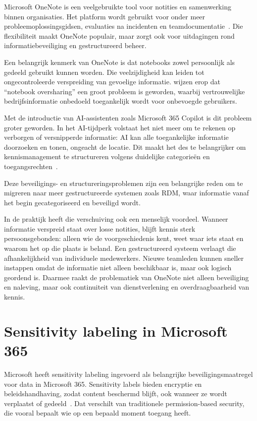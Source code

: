 Microsoft OneNote is een veelgebruikte tool voor notities en samenwerking binnen organisaties.
Het platform wordt gebruikt voor onder meer probleemoplossingsgidsen, evaluaties na incidenten en teamdocumentatie~\autocite{hay2025onenote}.
Die flexibiliteit maakt OneNote populair, maar zorgt ook voor uitdagingen rond informatiebeveiliging en gestructureerd beheer.

Een belangrijk kenmerk van OneNote is dat notebooks zowel persoonlijk als gedeeld gebruikt kunnen worden.
Die veelzijdigheid kan leiden tot ongecontroleerde verspreiding van gevoelige informatie.
\textcite{hay2025onenote} wijzen erop dat ``notebook oversharing'' een groot probleem is geworden, waarbij vertrouwelijke bedrijfsinformatie onbedoeld toegankelijk wordt voor onbevoegde gebruikers.

Met de introductie van AI-assistenten zoals Microsoft 365 Copilot is dit probleem groter geworden.
In het AI-tijdperk volstaat het niet meer om te rekenen op verborgen of versnipperde informatie: AI kan alle toegankelijke informatie doorzoeken en tonen, ongeacht de locatie.
Dit maakt het des te belangrijker om kennismanagement te structureren volgens duidelijke categorieën en toegangsrechten~\autocite{hay2025onenote}.

Deze beveiligings- en structureringsproblemen zijn een belangrijke reden om te migreren naar meer gestructureerde systemen zoals RDM, waar informatie vanaf het begin gecategoriseerd en beveiligd wordt.

In de praktijk heeft die verschuiving ook een menselijk voordeel. Wanneer informatie verspreid staat over losse notities, blijft kennis sterk persoonsgebonden: alleen wie de voorgeschiedenis kent, weet waar iets staat en waarom het op die plaats is beland. Een gestructureerd systeem verlaagt die afhankelijkheid van individuele medewerkers. Nieuwe teamleden kunnen sneller instappen omdat de informatie niet alleen beschikbaar is, maar ook logisch geordend is. Daarmee raakt de problematiek van OneNote niet alleen beveiliging en naleving, maar ook continuiteit van dienstverlening en overdraagbaarheid van kennis.

\section{Sensitivity labeling in Microsoft 365}
\label{sec:sensitivity-labeling}

Microsoft heeft sensitivity labeling ingevoerd als belangrijke beveiligingsmaatregel voor data in Microsoft 365.
Sensitivity labels bieden encryptie en beleidshandhaving, zodat content beschermd blijft, ook wanneer ze wordt verplaatst of gedeeld~\autocite{hay2025onenote}.
Dat verschilt van traditionele permission-based security, die vooral bepaalt wie op een bepaald moment toegang heeft.

